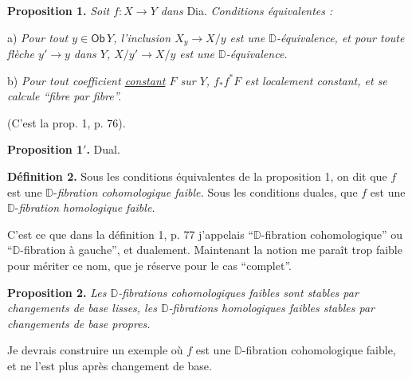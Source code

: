 \documentclass[11pt]{article}
\newcommand{\msp}[1]{\marginpar{\footnotesize [#1]}}
\newcommand{\Dia}{\textsf{Dia}}
\newcommand{\DD}{\mathbb{D}}
\begin{document}
\textbf{Proposition 1.} \textit{Soit $f : X \to Y$ dans} \Dia. \textit{Conditions équivalentes :}

a) \textit{Pour tout $y \in \mathsf{Ob}\, Y$, l'inclusion $X_y \to X/y$ est une $\DD$-équivalence, et pour toute flèche $y' \to y$ dans $Y$, $X/y' \to X/y$ est une $\DD$-équivalence.}

b) \textit{Pour tout coefficient \underline{constant} $F$ sur $Y$, $f_{*}f^{*}F$ est localement constant, et se calcule “fibre par fibre”.}

(C'est la prop. 1, p. 76).

\textbf{Proposition 1$'$.} Dual.

\msp{page 116}

\textbf{Définition 2.} Sous les conditions équivalentes de la proposition 1, on dit que $f$ est une $\DD$-\textit{fibration cohomologique faible.} Sous les conditions duales, que $f$ est une $\DD$-\textit{fibration homologique faible.}

C'est ce que dans la définition 1, p. 77 j'appelais “$\DD$-fibration cohomologique” ou “$\DD$-fibration à gauche”, et dualement. Maintenant la notion me paraît trop faible pour mériter ce nom, que je réserve pour le cas “complet”.

\textbf{Proposition 2.} \textit{Les $\DD$-fibrations cohomologiques faibles sont stables par changements de base lisses, les $\DD$-fibrations homologiques faibles stables par changements de base propres.}

Je devrais construire un exemple où $f$ est une $\DD$-fibration cohomologique faible, et ne l'est plus après changement de base.
\end{document}
